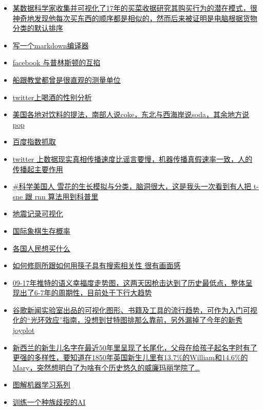 \documentclass[
]{book}
\begin{document}
\begin{itemize}
\item
  \href{http://sketches.christianlaesser.com/2018-01-08-shopping-pattern/}{某数据科学家收集并可视化了17年的买菜收据研究其购买行为的潜在模式，很神奇地发现他每次买东西的顺序都是相似的，然而后来被证明是电脑根据货物分类的默认排序}
\item
  \href{https://blog.beezwax.net/2017/07/07/writing-a-markdown-compiler/}{写一个markdown编译器}
\item
  \href{https://www.facebook.com/notes/mike-develin/debunking-princeton/10151947421191849}{facebook 与普林斯顿的互掐}
\item
  \href{http://longstreet.typepad.com/thesciencebookstore/2016/03/measuring-things-with-ships.html}{船跟教堂都曾是很直观的测量单位}
\item
  \href{https://qz.com/486704/this-is-how-men-and-women-drink-according-to-twitter/}{twitter上喝酒的性别分析}
\item
  \href{http://popvssoda.com/}{美国各地对饮料的提法，南部人说coke，东北与西海岸说soda，其余地方说pop}
\item
  \href{https://mp.weixin.qq.com/s/b3g-VycUoLaZgTWkgznU9g}{百度指数抓取}
\item
  \href{http://science.sciencemag.org/content/359/6380/1146}{twitter 上数据现实真相传播速度比谣言要慢，机器传播真假速率一致，人的传播起主要作用}
\item
  \href{https://blogs.scientificamerican.com/sa-visual/in-silico-flurries/}{\#科学美国人 雪花的生长模拟与分类，脑洞很大，这是我头一次看到有人把 t-sne 跟 rnn 算法用到科普里}
\item
  \href{https://geovisualist.com/2015/06/22/visualizing-100-years-of-earthquakes/}{地震记录可视化}
\item
  \href{https://www.quora.com/What-are-the-chances-of-survival-of-individual-chess-pieces-in-average-games}{国际象棋生存概率}
\item
  \href{https://www.fixr.com/blog/2015/04/17/world-of-obsessions/}{各国人民想买什么}
\item
  \href{http://how-to-fix-a-toilet.com/}{如何修厕所跟如何用筷子具有搜索相关性 很有画面感}
\item
  \href{http://hedonometer.org/index.html?from=2008-09-10}{09-17年推特的语义幸福度走势图，这两天因枪击达到了历史最低点，整体呈现出了6-7年的周期性，目前处于下行大趋势}
\item
  \href{http://visualizationuniverse.com/}{谷歌新闻实验室出品的可视化图形、书籍及工具的流行趋势，可作为入门可视化的``光环效应''指南，没想到甘特图排那么靠前，另外漏掉了今年的新秀joyplot}
\item
  \href{https://www.statschat.org.nz/2018/01/08/long-tail-of-baby-names/}{新西兰的新生儿名字在最近50年里呈现了长尾化，父母在给孩子起名字时有了更强的多样性，要知道在1850年英国新生儿里有13.7\%的William和14.6\%的Mary，突然想明白了为啥有个历史悠久的威廉玛丽学院了\ldots{}}
\item
  \href{http://www.r2d3.us/\%E5\%9B\%BE\%E8\%A7\%A3\%E6\%9C\%BA\%E5\%99\%A8\%E5\%AD\%A6\%E4\%B9\%A0/}{图解机器学习系列}
\item
  \href{https://notstatschat.rbind.io/2018/09/27/how-to-write-a-racist-ai-in-r-without-really-trying/}{训练一个种族歧视的AI}
\end{itemize}
\end{document}
